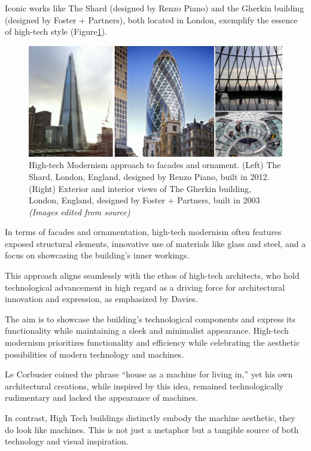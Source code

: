 Iconic works like The Shard (designed by Renzo Piano) and the Gherkin building (designed by Foster + Partners), both located in London, exemplify the essence of high-tech style (Figure\ref{fig:hightechmodernism}).

     \begin{figure}[htb]
          \centering
          \includegraphics[width= \linewidth]{Images/hightechmodernism}
          \caption{High-tech Modernism approach to facades and ornament. (Left) The Shard, London, England, designed by Renzo Piano, built in 2012. (Right) Exterior and interior views of The Gherkin building, London, England, designed by  Foster + Partners, built in 2003 \textit{(Images edited from source)}}
          \label{fig:hightechmodernism}
        \end{figure}

In terms of facades and ornamentation, high-tech modernism often features exposed structural elements, innovative use of materials like glass and steel, and a focus on showcasing the building's inner workings.

This approach aligns seamlessly with the ethos of high-tech architects, who hold technological advancement in high regard as a driving force for architectural innovation and expression, as emphasized by Davies\cite{Davies1988}.

The aim is to showcase the building's technological components and express its functionality while maintaining a sleek and minimalist appearance.
High-tech modernism prioritizes functionality and efficiency while celebrating the aesthetic possibilities of modern technology and machines.

Le Corbusier coined the phrase ``house as a machine for living in,'' yet his own architectural creations, while inspired by this idea, remained technologically rudimentary and lacked the appearance of machines.

In contrast, High Tech buildings distinctly embody the machine aesthetic, they do look like machines.
This is not just a metaphor but a tangible source of both technology and visual inspiration\cite{Davies1988}.

